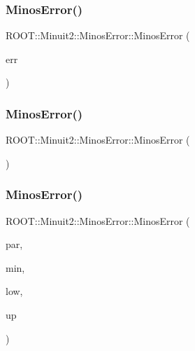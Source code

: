 \subsubsection{\texorpdfstring{MinosError()}{MinosError()}\hspace{0.1cm}{\footnotesize\ttfamily [3/6]}}
{\footnotesize\ttfamily R\+O\+O\+T\+::\+Minuit2\+::\+Minos\+Error\+::\+Minos\+Error (\begin{DoxyParamCaption}\item[{const \mbox{\hyperlink{classROOT_1_1Minuit2_1_1MinosError}{Minos\+Error}} \&}]{err }\end{DoxyParamCaption})\hspace{0.3cm}{\ttfamily [inline]}}

\mbox{\label{classROOT_1_1Minuit2_1_1MinosError_a5cb0fad5d73d20905a57fb1c505c9fd2}} 
\subsubsection{\texorpdfstring{MinosError()}{MinosError()}\hspace{0.1cm}{\footnotesize\ttfamily [4/6]}}
{\footnotesize\ttfamily R\+O\+O\+T\+::\+Minuit2\+::\+Minos\+Error\+::\+Minos\+Error (\begin{DoxyParamCaption}{ }\end{DoxyParamCaption})\hspace{0.3cm}{\ttfamily [inline]}}

\mbox{\label{classROOT_1_1Minuit2_1_1MinosError_a400609986f7b4e3a93eab1a35e1f33ce}} 
\subsubsection{\texorpdfstring{MinosError()}{MinosError()}\hspace{0.1cm}{\footnotesize\ttfamily [5/6]}}
{\footnotesize\ttfamily R\+O\+O\+T\+::\+Minuit2\+::\+Minos\+Error\+::\+Minos\+Error (\begin{DoxyParamCaption}\item[{unsigned int}]{par,  }\item[{double}]{min,  }\item[{const \mbox{\hyperlink{classROOT_1_1Minuit2_1_1MnCross}{Mn\+Cross}} \&}]{low,  }\item[{const \mbox{\hyperlink{classROOT_1_1Minuit2_1_1MnCross}{Mn\+Cross}} \&}]{up }\end{DoxyParamCaption})\hspace{0.3cm}{\ttfamily [inline]}}

